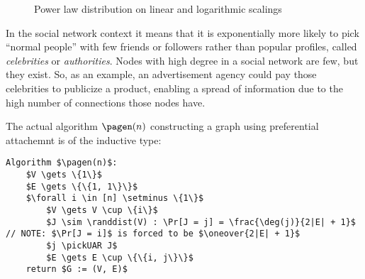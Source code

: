 \begin{figure}[ht]
    \centering
    \textwidth
    \caption{Power law distribution on linear and logarithmic scalings}
    \label{fig:power-law}
\end{figure}

In the social network context it means that it is exponentially more likely to pick ``normal people'' with few friends or followers rather than popular profiles, called \emph{celebrities} or \emph{authorities}. Nodes with high degree in a social network are few, but they exist. So, as an example, an advertisement agency could pay those celebrities to publicize a product, enabling a spread of information due to the high number of connections those nodes have.

The actual algorithm $\pagen(n)$ constructing a graph using preferential attachemnt is of the inductive type:

\begin{lstlisting}[caption = {The $\pagen(n)$ algorithm}, label = {lst:algopa}]
Algorithm $\pagen(n)$:
    $V \gets \{1\}$
    $E \gets \{\{1, 1\}\}$
    $\forall i \in [n] \setminus \{1\}$
        $V \gets V \cup \{i\}$
        $J \sim \randdist(V) : \Pr[J = j] = \frac{\deg(j)}{2|E| + 1}$ // NOTE: $\Pr[J = i]$ is forced to be $\oneover{2|E| + 1}$
        $j \pickUAR J$
        $E \gets E \cup \{\{i, j\}\}$
    return $G := (V, E)$
\end{lstlisting}


